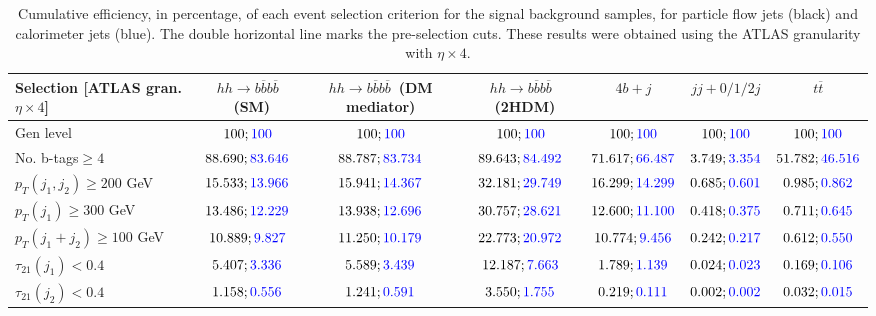\begin{landscape}
		\begin{table}
			\centering
			\caption{Cumulative efficiency, in percentage, of each event selection criterion for the signal background samples, for particle flow jets (black) and calorimeter jets (blue). The double horizontal line marks the pre-selection cuts. These results were obtained using the ATLAS granularity with $\eta\times 4$.}
			\begin{tabular}{lcccccc}
				\toprule 
				\textbf{Selection [ATLAS gran. $\eta\times 4$]} & $hh\rightarrow b\overline{b}b\overline{b}$~(SM) & $hh\rightarrow b\overline{b}b\overline{b}$~(DM mediator) & $hh\rightarrow b\overline{b}b\overline{b}$~(2HDM) & $4b+j$  & $jj+0/1/2 j$ & $t\overline{t}$ \\
				\midrule
				Gen level & $100;\textcolor{blue}{100}$ & $100;\textcolor{blue}{100}$ &$100;\textcolor{blue}{100}$& $100;\textcolor{blue}{100}$& $100;\textcolor{blue}{100}$& $100;\textcolor{blue}{100}$ \\
				\rowcolor{black!7}No. b-tags$\geq 4$&$88.690;\textcolor{blue}{83.646}$&$88.787;\textcolor{blue}{83.734}$&$89.643;\textcolor{blue}{84.492}$&$71.617;\textcolor{blue}{66.487}$&$3.749;\textcolor{blue}{3.354}$&$51.782;\textcolor{blue}{46.516}$\\
				$p_T(j_1,j_2)\geq200$ GeV & $15.533;\textcolor{blue}{13.966}$ & $15.941;\textcolor{blue}{14.367}$&$32.181;\textcolor{blue}{29.749}$ &$16.299;\textcolor{blue}{14.299}$&$0.685;\textcolor{blue}{0.601}$&$0.985;\textcolor{blue}{0.862}$\\ 
				\midrule \midrule
				\rowcolor{black!7}$p_T(j_1)\geq 300$ GeV & $13.486;\textcolor{blue}{12.229}$ &$13.938;\textcolor{blue}{12.696}$  &$30.757;\textcolor{blue}{28.621}$&$12.600;\textcolor{blue}{11.100}$&$0.418;\textcolor{blue}{0.375}$&$0.711;\textcolor{blue}{0.645}$\\ 
				$p_T(j_1+j_2)\geq 100$ GeV &$10.889;\textcolor{blue}{9.827}$ & $11.250;\textcolor{blue}{10.179}$ &$22.773;\textcolor{blue}{20.972}$&$10.774;\textcolor{blue}{9.456}$&$0.242;\textcolor{blue}{0.217}$&$0.612;\textcolor{blue}{0.550}$\\
				\rowcolor{black!7}$\tau_{21}(j_1)<0.4$ & $5.407;\textcolor{blue}{3.336}$& $5.589;\textcolor{blue}{3.439}$&$12.187;\textcolor{blue}{7.663}$&$1.789;\textcolor{blue}{1.139}$&$0.024;\textcolor{blue}{0.023}$&$0.169;\textcolor{blue}{0.106}$\\
				$\tau_{21}(j_2)<0.4$ &$1.158;\textcolor{blue}{0.556}$ &$1.241;\textcolor{blue}{0.591}$ &$3.550;\textcolor{blue}{1.755}$&$0.219;\textcolor{blue}{0.111}$&$0.002;\textcolor{blue}{0.002}$&$0.032;\textcolor{blue}{0.015}$\\

\end{tabular}
\end{table}
\end{landscape}
